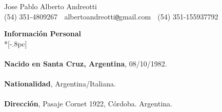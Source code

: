 \documentclass[a4paper,11pt,english]{article}
\begin{document}
\begin{center}
{\Large Jose Pablo Alberto Andreotti} \\[.5pc]
(54) 351-4809267 $\;$ albertoandreotti\verb|@|gmail.com $\;$ (54) 351-155937792 \\[3pc]
\end{center}
{\large \bf Informaci\'on Personal } \\*[-.8pc]
\underline{\hspace{6in}} \\
\\
{\bf Nacido en Santa Cruz, Argentina}, 08/10/1982.\\
\\
{\bf Nationalidad}, Argentina/Italiana.\\
\\
{\bf Direcci\'on}, Pasaje Cornet 1922, C\'ordoba. Argentina.\\
\end{document}
